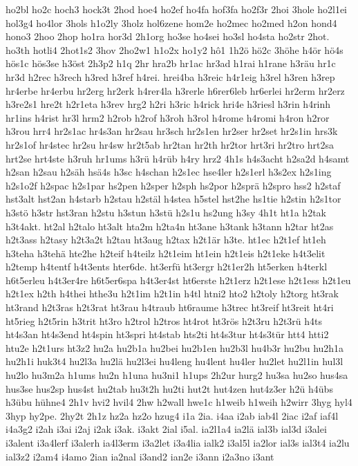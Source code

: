 {ho2bl
ho2c
hoch3
hock3t
2hod
hoe4
ho2ef
ho4fa
hof3fa
ho2f3r
2hoi
3hole
ho2l1ei
hol3g4
ho4lor
3hols
h1o2ly
3holz
hol6zene
hom2e
ho2mec
ho2med
h2on
hond4
hono3
2hoo
2hop
ho1ra
hor3d
2h1org
ho3se
ho4sei
ho3sl
ho4sta
ho2str
2hot.
ho3th
hotli4
2hot1s2
3hov
2ho2w1
h1o2x
ho1y2
hô1
1h2ö
hö2c
3höhe
h4ör
hö4s
hös1c
hös3se
h3öst
2h3p2
h1q
2hr
hra2b
hr1ac
hr3ad
h1rai
h1rane
h3räu
hr1c
hr3d
h2rec
h3rech
h3red
h3ref
h4rei.
hrei4ba
h3reic
h4r1eig
h3rel
h3ren
h3rep
hr4erbe
hr4erbu
hr2erg
hr2erk
h4rer4la
h3rerle
h6rer6leb
hr6erlei
hr2erm
hr2erz
h3re2s1
hre2t
h2r1eta
h3rev
hrg2
h2ri
h3ric
h4rick
hri4e
h3riesl
h3rin
h4rinh
hr1ins
h4rist
hr3l
hrm2
h2rob
h2rof
h3roh
h3rol
h4rome
h4romi
h4ron
h2ror
h3rou
hrr4
hr2s1ac
hr4s3an
hr2sau
hr3sch
hr2s1en
hr2ser
hr2set
hr2s1in
hrs3k
hr2s1of
hr4stec
hr2su
hr4sw
hr2t5ab
hr2tan
hr2th
hr2tor
hrt3ri
hr2tro
hrt2sa
hrt2se
hrt4ste
h3ruh
hr1ums
h3rü
h4rüb
h4ry
hrz2
4h1s
h4s3acht
h2sa2d
h4samt
h2san
h2sau
h2säh
hsä4s
h3sc
h4schan
h2s1ec
hse4ler
h2s1erl
h3s2ex
h2s1ing
h2s1o2f
h2spac
h2s1par
hs2pen
h2sper
h2sph
hs2por
h2sprä
h2spro
hss2
h2staf
hst3alt
hst2an
h4starb
h2stau
h2stäl
h4stea
h5stel
hst2he
hs1tie
h2stin
h2s1tor
h3stö
h3str
hst3ran
h2stu
h3stun
h3stü
h2s1u
hs2ung
h3sy
4h1t
ht1a
h2tak
h3t4akt.
ht2al
h2talo
ht3alt
hta2m
h2ta4n
ht3ane
h3tank
h3tann
h2tar
ht2as
h2t3ass
h2tasy
h2t3a2t
h2tau
ht3aug
h2tax
h2t1är
h3te.
ht1ec
h2t1ef
ht1eh
h3teha
h3tehä
hte2he
h2teif
h4teilz
h2t1eim
ht1ein
h2t1eis
h2t1eke
h4t3elit
h2temp
h4tentf
h4t3ents
hter6de.
ht3erfü
ht3ergr
h2t1er2h
ht5erken
h4terkl
h6t5erleu
h4t3er4re
h6t5er6spa
h4t3er4st
ht6erste
h2t1erz
h2t1ese
h2t1ess
h2t1eu
h2t1ex
h2th
h4thei
hthe3u
h2t1im
h2t1in
h4tl
htni2
hto2
h2toly
h2torg
ht3rak
ht3rand
h2t3ras
h2t3rat
ht3rau
h4traub
ht6raume
h3trec
ht3reif
ht3reit
ht4ri
ht5rieg
h2t5rin
h3trit
ht3ro
h2trol
h2tros
ht4rot
ht3rös
h2t3ru
h2t3rü
h4ts
ht4s3an
ht4s3end
ht4spin
ht3spri
ht4stab
hts2ti
ht4s3tur
ht4s3tür
htt4
htti2
htu2e
h2t1urs
ht3z2
hu2a
hu2b1a
hu2bei
hu2b1en
hu2b3l
hu4b3r
hu2bu
hu2h1a
hu2h1i
huk3t4
hu2l3a
hu2lä
hu2l3ei
hu4leng
hu4lent
hu4ler
hu2let
hu2l1in
hul3l
hu2lo
hu3m2a
h1ums
hu2n
h1una
hu3ni1
h1ups
2h2ur
hurg2
hu3sa
hu2so
hus4sa
hus3se
hus2sp
hus4st
hu2tab
hu3t2h
hu2ti
hut2t
hut4zen
hut4z3er
h2ü
h4übs
h3übu
hühne4
2h1v
hvi2
hvil4
2hw
h2wall
hwe1c
h1weib
h1weih
h2wirr
3hyg
hyl4
3hyp
hy2pe.
2hy2t
2h1z
hz2a
hz2o
hzug4
i1a
2ia.
i4aa
i2ab
iab4l
2iac
i2af
iaf4l
i4a3g2
i2ah
i3ai
i2aj
i2ak
i3ak.
i3akt
2ial
i5al.
ia2l1a4
ia2lä
ial3b
ial3d
i3alei
i3alent
i3a4lerf
i3alerh
ia4l3erm
i3a2let
i3a4lia
ialk2
i3al5l
ia2lor
ial3s
ial3t4
ia2lu
ial3z2
i2am4
i4amo
2ian
ia2nal
i3and2
ian2e
i3ann
i2a3no
i3ant
}
